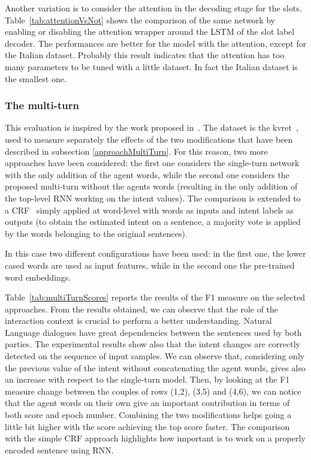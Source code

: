 

Another variation is to consider the attention in the decoding stage for the slots. Table~\ref{tab:attentionVsNot} shows the comparison of the same network by enabling or disabling the attention wrapper around the LSTM of the slot label decoder. The performances are better for the model with the attention, except for the Italian dataset. Probably this result indicates that the attention has too many parameters to be tuned with a little dataset. In fact the Italian dataset is the smallest one.



\subsubsection{The multi-turn}
This evaluation is inspired by the work proposed in~\cite{mensio2018multi}. The dataset is the kvret~\cite{eric2017key}, used to measure separately the effects of the two modifications that have been described in subsection \ref{approachMultiTurn}. For this reason, two more approaches have been considered: the first one considers the single-turn network with the only addition of the agent words, while the second one considers the proposed multi-turn without the agents words (resulting in the only addition of the top-level RNN working on the intent values). The comparison is extended to a CRF~\cite{lafferty2001conditional} simply applied at word-level with words as inputs and intent labels as outputs (to obtain the estimated intent on a sentence, a majority vote is applied by the words belonging to the original sentences). 

In this case two different configurations have been used: in the first one, the lower cased words are used as input features, while in the second one the pre-trained word embeddings.



Table~\ref{tab:multiTurnScores} reports the results of the F1 measure on the selected approaches. From the results obtained, we can observe that the role of the interaction context is crucial to perform a better understanding. Natural Language dialogues have great dependencies between the sentences used by both parties. The experimental results show also that the intent changes are correctly detected on the sequence of input samples. We can observe that, considering only the previous value of the intent without concatenating the agent words, gives also an increase with respect to the single-turn model. Then, by looking at the F1 measure change between the couples of rows (1,2), (3,5) and (4,6), we can notice that the agent words on their own give an important contribution in terms of both score and epoch number. Combining the two  modifications helps going a little bit higher with the score achieving the top score faster. The comparison with the simple CRF approach highlights how important is to work on a properly encoded sentence using RNN.

